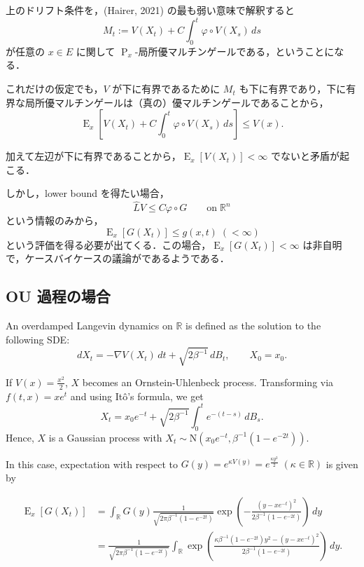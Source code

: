 \documentclass[
]{article}
\begin{document}
\begin{tcolorbox}[enhanced jigsaw, opacitybacktitle=0.6, colback=white, breakable, toptitle=1mm, titlerule=0mm, left=2mm, colframe=quarto-callout-note-color-frame, title={証明}, colbacktitle=quarto-callout-note-color!10!white, coltitle=black, bottomtitle=1mm, arc=.35mm, leftrule=.75mm, bottomrule=.15mm, rightrule=.15mm, opacityback=0, toprule=.15mm]

上のドリフト条件を，(Hairer, 2021) の最も弱い意味で解釈すると \[
M_t:=V(X_t)+C\int^t_0\varphi\circ V(X_s)\,ds
\] が任意の \(x\in E\) に関して
\(\operatorname{P}_x\)-局所優マルチンゲールである，ということになる．

これだけの仮定でも，\(V\) が下に有界であるために \(M_t\)
も下に有界であり，下に有界な局所優マルチンゲールは（真の）優マルチンゲールであることから，
\[
\operatorname{E}_x\left[V(X_t)+C\int^t_0\varphi\circ V(X_s)\,ds\right]\le V(x).
\]

加えて左辺が下に有界であることから，\(\operatorname{E}_x[V(X_t)]<\infty\)
でないと矛盾が起こる．

\end{tcolorbox}

しかし，lower bound を得たい場合， \[
\widehat{L}V\le C\varphi\circ G\qquad\mathrm{on}\;\mathbb{R}^n
\] という情報のみから， \[
\operatorname{E}_x[G(X_t)]\le g(x,t)\;(<\infty)
\]
という評価を得る必要が出てくる．この場合，\(\operatorname{E}_x[G(X_t)]<\infty\)
は非自明で，ケースバイケースの議論がであるようである．

\subsection{OU 過程の場合}\label{ou-ux904eux7a0bux306eux5834ux5408}

An overdamped Langevin dynamics on \(\mathbb{R}\) is defined as the
solution to the following SDE: \[
dX_t=-\nabla V(X_t)\,dt+\sqrt{2\beta^{-1}}\,dB_t,\qquad X_0=x_0.
\]

If \(V(x)=\frac{x^2}{2}\), \(X\) becomes an Ornstein-Uhlenbeck process.
Transforming via \(f(t,x)=xe^t\) and using Itô's formula, we get \[
X_t=x_0e^{-t}+\sqrt{2\beta^{-1}}\int^t_0e^{-(t-s)}\,dB_s.
\] Hence, \(X\) is a Gaussian process with
\(X_t\sim\mathrm{N}\left(x_0e^{-t},\beta^{-1}(1-e^{-2t})\right)\).

In this case, expectation with respect to
\(G(y)=e^{\kappa V(y)}=e^{\frac{\kappa y^2}{2}}\;(\kappa\in\mathbb{R})\)
is given by

\begin{align*}
    \operatorname{E}_x[G(X_t)]&=\int_{\mathbb{R}} G(y)\frac{1}{\sqrt{2\pi\beta^{-1}(1-e^{-2t})}}\exp\left(-\frac{(y-xe^{-t})^2}{2\beta^{-1}(1-e^{-2t})}\right)\,dy\\
    &=\frac{1}{\sqrt{2\pi\beta^{-1}(1-e^{-2t})}}\int_{\mathbb{R}}\exp\left(\frac{\kappa\beta^{-1}(1-e^{-2t})y^2-(y-xe^{-t})^2}{2\beta^{-1}(1-e^{-2t})}\right)\,dy.
\end{align*}
\end{document}
